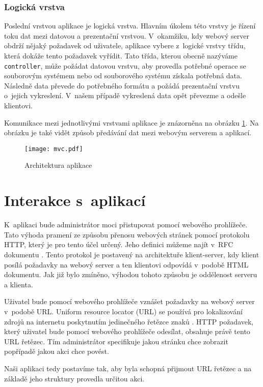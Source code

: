         \subsubsection{Logická vrstva}
        Poslední vrstvou aplikace je logická vrstva. Hlavním úkolem této vrstvy je řízení toku dat mezi datovou a prezentační vrstvou. V~okamžiku, kdy webový server obdrží nějaký požadavek od uživatele, aplikace vybere z~logické vrstvy třídu, která dokáže tento požadavek vyřídit. Tato třída, kterou obecně nazýváme \verb|controller|, může požádat datovou vrstvu, aby provedla potřebné operace se souborovým systémem nebo od souborového systému získala potřebná data. Následně data převede do potřebného formátu a požádá prezentační vrstvu o~jejich vykreslení. V~našem případě vykreslená data opět převezme a odešle klientovi.

        Komunikace mezi jednotlivými vrstvami aplikace je znázorněna na obrázku \ref{mvc}. Na obrázku je také vidět způsob předávání dat mezi webovým serverem a aplikací.

    \begin{figure}
        \centering
        \texttt{[image: mvc.pdf]}
        \caption{Architektura aplikace}
        \label{mvc}
    \end{figure}
\section{Interakce s~aplikací}
K~aplikaci bude administrátor moci přistupovat pomocí webového prohlížeče. Tato výhoda pramení ze způsobu přenosu webových stránek pomocí protokolu HTTP, který je pro tento účel určený. Jeho definici můžeme najít v~RFC dokumentu \cite{RFC2616}. Tento protokol je postavený na architektuře klient-server, kdy klient posílá požadavky na webový server a ten klientovi odpovídá v~podobě HTML dokumentu. Jak již bylo zmíněno, výhodou tohoto způsobu je oddělenost serveru a klienta.

Uživatel bude pomocí webového prohlížeče vznášet požadavky na webový server v~podobě URL. Uniform resource locator (URL) se používá pro lokalizování zdrojů na internetu poskytnutím jedinečného řetězce znaků \cite{RFC3986}. HTTP požadavek, který uživatel bude pomocí webového prohlížeče odesílat, obsahuje právě tento URL řetězec. Tím administrátor specifikuje jakou stránku chce zobrazit popřípadě jakou akci chce povést.

Naši aplikaci tedy postavíme tak, aby byla schopná přijmout URL řetězec a na základě jeho struktury provedla určitou akci.

